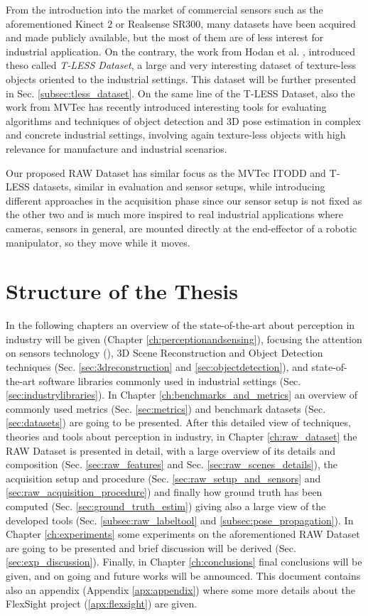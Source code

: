 From the introduction into the market of commercial sensors such as the aforementioned Kinect 2 or Realsense SR300, many datasets have been acquired and made publicly available, but the most of them are of less interest for industrial application. On the contrary, the work from Hodan et al. \cite{hodan2017tless}, introduced theso called \emph{T-LESS Dataset}, a large and very interesting dataset of texture-less objects oriented to the industrial settings. This dataset will be further presented in Sec. \ref{subsec:tless_dataset}. On the same line of the T-LESS Dataset, also the work from MVTec \cite{mvtec2017itodd} has recently introduced interesting tools for evaluating algorithms and techniques of object detection and 3D pose estimation in complex and concrete industrial settings, involving again texture-less objects with high relevance for manufacture and industrial scenarios. 

Our proposed RAW Dataset has similar focus as the MVTec ITODD and T-LESS datasets, similar in evaluation and sensor setups, while introducing different approaches in the acquisition phase since our sensor setup is not fixed as the other two and is much more inspired to real industrial applications where cameras, sensors in general, are mounted directly at the end-effector of a robotic manipulator, so they move while it moves.

\section{Structure of the Thesis}\label{sec:thesisstructure}
In the following chapters an overview of the state-of-the-art about perception in industry will be given (Chapter \ref{ch:perceptionandsensing}), focusing the attention on sensors technology (), 3D Scene Reconstruction and Object Detection techniques (Sec. \ref{sec:3dreconstruction} and \ref{sec:objectdetection}), and state-of-the-art software libraries commonly used in industrial settings (Sec. \ref{sec:industrylibraries}). In Chapter \ref{ch:benchmarks_and_metrics} an overview of commonly used metrics (Sec. \ref{sec:metrics}) and benchmark datasets (Sec. \ref{sec:datasets}) are going to be presented. After this detailed view of techniques, theories and tools about perception in industry, in Chapter \ref{ch:raw_dataset} the RAW Dataset is presented in detail, with a large overview of its details and composition (Sec. \ref{sec:raw_features} and Sec. \ref{sec:raw_scenes_details}), the acquisition setup and procedure (Sec. \ref{sec:raw_setup_and_sensors} and \ref{sec:raw_acquisition_procedure}) and finally how ground truth has been computed (Sec. \ref{sec:ground_truth_estim}) giving also a large view of the developed tools (Sec. \ref{subsec:raw_labeltool} and \ref{subsec:pose_propagation}). In Chapter \ref{ch:experiments} some experiments on the aforementioned RAW Dataset are going to be presented and brief discussion will be derived (Sec. \ref{sec:exp_discussion}). Finally, in Chapter \ref{ch:conclusions} final conclusions will be given, and on going and future works will be announced. This document contains also an appendix (Appendix \ref{apx:appendix}) where some more details about the FlexSight project (\ref{apx:flexsight}) are given.
